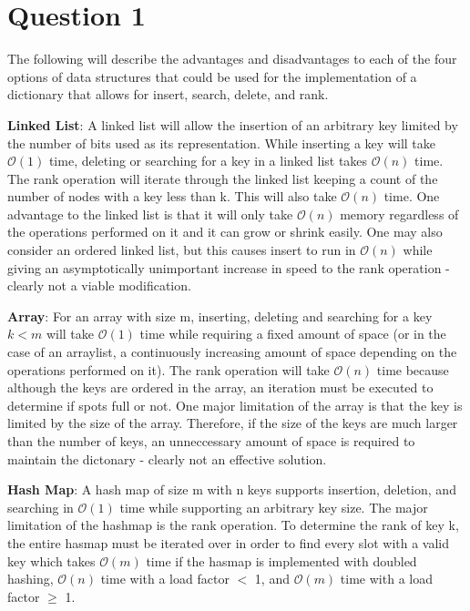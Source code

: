 \section{Question 1}
The following will describe the advantages and disadvantages to each of the four options of data structures that could be used for the implementation of a dictionary that allows for insert, search, delete, and rank.

\textbf{Linked List}:
A linked list will allow the insertion of an arbitrary key limited by the number of bits used as its representation. While inserting a key will take $\mathcal{O}(1)$ time, deleting or searching for a key in a linked list takes $\mathcal{O}(n)$ time. The rank operation will iterate through the linked list keeping a count of the number of nodes with a key less than k. This will also take $\mathcal{O}(n)$ time. One advantage to the linked list is that it will only take $\mathcal{O}(n)$ memory regardless of the operations performed on it and it can grow or shrink easily. One may also consider an ordered linked list, but this causes insert to run in $\mathcal{O}(n)$ while giving an asymptotically unimportant increase in speed to the rank operation - clearly not a viable modification.

\textbf{Array}:
For an array with size m, inserting, deleting and searching for a key $k < m$ will take $\mathcal{O}(1)$ time while requiring a fixed amount of space (or in the case of an arraylist, a continuously increasing amount of space depending on the operations performed on it). The rank operation will take $\mathcal{O}(n)$ time because although the keys are ordered in the array, an iteration must be executed to determine if spots full or not. One major limitation of the array is that the key is limited by the size of the array. Therefore, if the size of the keys are much larger than the number of keys, an unneccessary amount of space is required to maintain the dictonary - clearly not an effective solution.

\textbf{Hash Map}:
A hash map of size m with n keys supports insertion, deletion, and searching in $\mathcal{O}(1)$ time while supporting an arbitrary key size. The major limitation of the hashmap is the rank operation. To determine the rank of key k, the entire hasmap must be iterated over in order to find every slot with a valid key which takes $\mathcal{O}(m)$ time if the hasmap is implemented with doubled hashing, $\mathcal{O}(n)$ time with a load factor $<$ 1, and $\mathcal{O}(m)$ time with a load factor $\geq$ 1.

